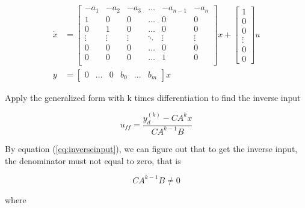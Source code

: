 \documentclass[12pt]{article}
\begin{document}
  \begin{align}
    \dot{x} &=
    \begin{bmatrix}
    -a_1   & -a_2   & -a_3   & \dots  & -a_{n-1} & -a_n   \\
    1      & 0      & 0      & \dots  & 0        & 0      \\
    0      & 1      & 0      & \dots  & 0        & 0      \\
    \vdots & \vdots & \vdots & \ddots & \vdots   & \vdots \\
    0      & 0      & 0      & \dots  & 0        & 0      \\
    0      & 0      & 0      & \dots  & 1        & 0      \\
    \end{bmatrix} x +
    \begin{bmatrix}
    1 \\ 0 \\ 0 \\ \vdots \\ 0 \\ 0
    \end{bmatrix} u \\
    y &=
    \begin{bmatrix}
    0 & \dots & 0 & b_0 & \dots & b_m
    \end{bmatrix} x
  \end{align}

  Apply the generalized form with k times differentiation to find the inverse input

  \begin{equation}
    u_{ff} = \frac{y^{(k)}_d - CA^kx}{CA^{k-1}B}
    \label{eq:inverseinput}
  \end{equation}

  By equation (\ref{eq:inverseinput}), we can figure out that to get the inverse input, the denominator must not equal to zero, that is

  \begin{equation}
    CA^{k-1}B \neq 0
  \end{equation}

  where
\end{document}
